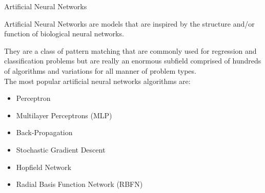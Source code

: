 \documentclass{beamer}
\begin{document}
\begin{frame}{Artificial Neural Networks}
\begin{flushleft}
	Artificial Neural Networks are models that are inspired by the structure and/or function of biological neural networks.

They are a class of pattern matching that are commonly used for regression and classification problems but are really an enormous subfield comprised of hundreds of algorithms and variations for all manner of problem types.
\\
\vspace{10pt}
The most popular artificial neural networks algorithms are:

\begin{itemize}
	\item Perceptron
\item Multilayer Perceptrons (MLP)
\item Back-Propagation
\item Stochastic Gradient Descent
\item Hopfield Network
\item Radial Basis Function Network (RBFN)
\end{itemize}

	\end{flushleft}
\end{frame}
\end{document}
